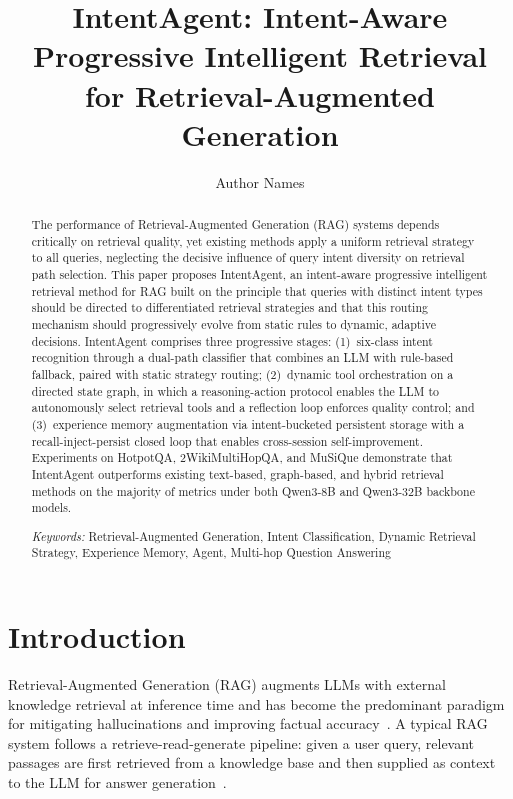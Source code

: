 \documentclass[runningheads]{llncs}
\begin{document}
\title{IntentAgent: Intent-Aware Progressive Intelligent Retrieval\\for Retrieval-Augmented Generation}

\author{Author Names}

\maketitle

\begin{abstract}
The performance of Retrieval-Augmented Generation (RAG) systems depends critically on retrieval quality, yet existing methods apply a uniform retrieval strategy to all queries, neglecting the decisive influence of query intent diversity on retrieval path selection. This paper proposes IntentAgent, an intent-aware progressive intelligent retrieval method for RAG built on the principle that queries with distinct intent types should be directed to differentiated retrieval strategies and that this routing mechanism should progressively evolve from static rules to dynamic, adaptive decisions. IntentAgent comprises three progressive stages: (1)~six-class intent recognition through a dual-path classifier that combines an LLM with rule-based fallback, paired with static strategy routing; (2)~dynamic tool orchestration on a directed state graph, in which a reasoning-action protocol enables the LLM to autonomously select retrieval tools and a reflection loop enforces quality control; and (3)~experience memory augmentation via intent-bucketed persistent storage with a recall-inject-persist closed loop that enables cross-session self-improvement. Experiments on HotpotQA, 2WikiMultiHopQA, and MuSiQue demonstrate that IntentAgent outperforms existing text-based, graph-based, and hybrid retrieval methods on the majority of metrics under both Qwen3-8B and Qwen3-32B backbone models.

\noindent\textit{Keywords:} Retrieval-Augmented Generation, Intent Classification, Dynamic Retrieval Strategy, Experience Memory, Agent, Multi-hop Question Answering
\end{abstract}

\section{Introduction}

Retrieval-Augmented Generation (RAG) augments LLMs with external knowledge retrieval at inference time and has become the predominant paradigm for mitigating hallucinations and improving factual accuracy~\cite{ref1}. A typical RAG system follows a retrieve-read-generate pipeline: given a user query, relevant passages are first retrieved from a knowledge base and then supplied as context to the LLM for answer generation~\cite{ref2}.
\end{document}
